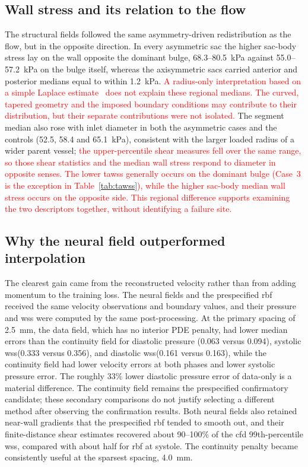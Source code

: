 \documentclass[12pt,a4paper]{article}
\newcommand{\cfdrevision}[1]{\textcolor{red}{#1}}
\newcommand{\CFD}{\ac{cfd}\xspace}
\newcommand{\WSS}{\ac{wss}\xspace}
\newcommand{\TAWSS}{\ac{tawss}\xspace}
\newcommand{\RBF}{\ac{rbf}\xspace}
\theoremstyle{definition}
\numberwithin{equation}{section}
\begin{document}
\subsection{Wall stress and its relation to the flow}
The structural fields followed the same asymmetry-driven redistribution as the flow, but in the opposite direction. In every asymmetric sac the higher sac-body stress lay on the wall opposite the dominant bulge, 68.3--80.5~kPa against 55.0--57.2~kPa on the bulge itself, whereas the axisymmetric sacs carried anterior and posterior medians equal to within 1.2~kPa. \cfdrevision{A radius-only interpretation based on a simple Laplace estimate~\cite{dobrin1989pathophysiology} does not explain these regional medians. The curved, tapered geometry and the imposed boundary conditions may contribute to their distribution, but their separate contributions were not isolated.} The segment median also rose with inlet diameter in both the asymmetric cases and the controls (52.5, 58.4 and 65.1~kPa), consistent with the larger loaded radius of a wider parent vessel; \cfdrevision{the upper-percentile shear measures fell over the same range, so those shear statistics and the median wall stress respond to diameter in opposite senses.} \cfdrevision{The lower \TAWSS generally occurs on the dominant bulge (Case~3 is the exception in Table~\ref{tab:tawss}), while the higher sac-body median wall stress occurs on the opposite side. This regional difference supports examining the two descriptors together, without identifying a failure site.} 

\subsection{Why the neural field outperformed interpolation}
The clearest gain came from the reconstructed velocity rather than from adding momentum to the training loss. The neural fields and the prespecified \RBF received the same velocity observations and boundary values, and their pressure and \WSS were computed by the same post-processing. At the primary spacing of 2.5~mm, the data field, which has no interior PDE penalty, had lower median errors than the continuity field for diastolic pressure (0.063 versus 0.094), systolic \WSS (0.333 versus 0.356), and diastolic \WSS (0.161 versus 0.163), while the continuity field had lower velocity errors at both phases and lower systolic pressure error. The roughly 33\% lower diastolic pressure error of data-only is a material difference. The continuity field remains the prespecified confirmatory candidate; these secondary comparisons do not justify selecting a different method after observing the confirmation results. Both neural fields also retained near-wall gradients that the prespecified \RBF tended to smooth out, and their finite-distance shear estimates recovered about 90--100\% of the \CFD 99th-percentile \WSS, compared with about half for \RBF at systole. The continuity penalty became consistently useful at the sparsest spacing, 4.0~mm.
\end{document}
